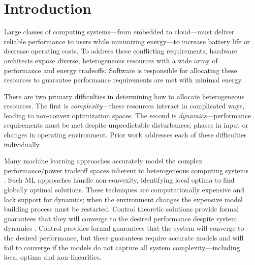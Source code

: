 \section{Introduction}
Large classes of computing systems---from embedded to cloud---must
deliver reliable performance to users while minimizing energy---to
increase battery life or decrease operating costs.  To address these
conflicting requirements, hardware architects expose diverse,
heterogeneous resources with a wide array of performance and energy
tradeoffs.  Software is responsible for allocating these resources to
guarantee performance requirements are met with minimal energy.


There are two primary difficulties in determining how to allocate
heterogeneous resources.  The first is \emph{complexity}---these
resources interact in complicated ways, leading to non-convex
optimization spaces.  The second is \emph{dynamics}---perfor\-mance
requirements must be met despite unpredictable disturbances; \eg{}
phases in input or changes in operating environment.  Prior work
addresses each of these difficulties individually.

Many machine learning approaches accurately model the complex
performance/power tradeoff spaces inherent to heterogeneous computing
systems
\cite{reddiHPCA2013,dubach2010,Bitirgen2008,Ipek,Koala,LEO,Flicker,Ponamarev}.
Such ML approaches handle non-convexity, identifying local optima to
find globally optimal solutions. These techniques are computationally
expensive and lack support for dynamics; \ie{} when the environment
changes the expensive model building process must be restarted.
Control theoretic solutions provide formal guarantees that they will
converge to the desired performance despite system dynamics
\cite{Hellerstein2004a,Chen2011,PTRADE,POET,ControlWare,Agilos,grace2}.
Control provides formal guarantees that the system will converge to
the desired performance, but these guarantees require accurate models
and will fail to converge if the models do not capture all system
complexity---including local optima and non-linearities.


